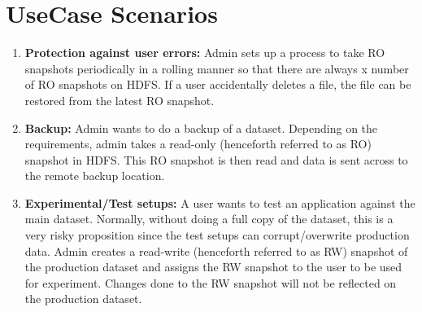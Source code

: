 \section{UseCase Scenarios}
\begin{enumerate}
\item \textbf{Protection against user errors:} Admin sets up a process to take RO snapshots periodically in a
rolling manner so that there are always x number of RO snapshots on HDFS. If a user
accidentally deletes a file, the file can be restored from the latest RO snapshot.
\item \textbf{Backup:} Admin wants to do a backup of a dataset. Depending on the requirements, admin takes
a read-only (henceforth referred to as RO) snapshot in HDFS. This RO snapshot is then read and
data is sent across to the remote backup location.
\item \textbf{Experimental/Test setups:} A user wants to test an application against the main dataset. Normally, without doing a full copy of the dataset, this is a very risky proposition since the test setups can corrupt/overwrite production data. Admin creates a read-write (henceforth referred to as RW) snapshot of the production dataset and assigns the RW snapshot to the user to be used for experiment. Changes done to the RW snapshot will not be reflected on the production dataset.

\end{enumerate}


